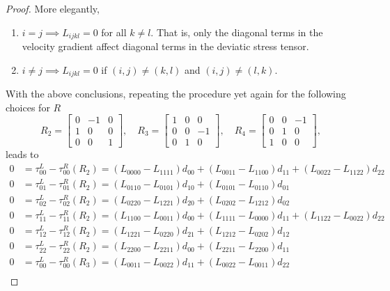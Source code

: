 \begin{proof}
    More elegantly,
    \begin{enumerate}
        \item $i=j \implies L_{ijkl}=0$ for all $k\neq l$.  That is, only the diagonal terms in the velocity gradient
            affect diagonal terms in the deviatic stress tensor.
        \item $i\neq j \implies L_{ijkl}=0$ if $(i,j)\neq (k,l)$ and $(i,j)\neq(l,k)$.
    \end{enumerate}
    With the above conclusions, repeating the procedure yet again for the following choices for $R$
    \begin{equation}
        R_2 = \begin{bmatrix}
            0 & -1 & 0 \\
            1 & 0 & 0 \\
            0 & 0 & 1
        \end{bmatrix}, \quad
        R_3 = \begin{bmatrix}
            1 & 0 & 0 \\
            0 & 0 & -1 \\
            0 & 1 & 0
        \end{bmatrix}, \quad
        R_4 = \begin{bmatrix}
            0 & 0 & -1 \\
            0 & 1 & 0  \\
            1 & 0 & 0
        \end{bmatrix},
    \end{equation}
    leads to
    \begin{align}
        0 &= \tau^L_{00} - \tau^R_{00}(R_2) = (L_{0000} - L_{1111})d_{00} + (L_{0011} - L_{1100})d_{11} + (L_{0022} - L_{1122})d_{22} \\
        0 &= \tau^L_{01} - \tau^R_{01}(R_2) = (L_{0110} - L_{0101})d_{10} + (L_{0101} - L_{0110})d_{01} \\
        0 &= \tau^L_{02} - \tau^R_{02}(R_2) = (L_{0220} - L_{1221})d_{20} + (L_{0202} - L_{1212})d_{02} \\
        0 &= \tau^L_{11} - \tau^R_{11}(R_2) = (L_{1100} - L_{0011})d_{00} + (L_{1111} - L_{0000})d_{11} + (L_{1122} - L_{0022})d_{22} \\
        0 &= \tau^L_{12} - \tau^R_{12}(R_2) = (L_{1221} - L_{0220})d_{21} + (L_{1212} - L_{0202})d_{12} \\
        0 &= \tau^L_{22} - \tau^R_{22}(R_2) = (L_{2200} - L_{2211})d_{00} + (L_{2211} - L_{2200})d_{11} \\
        0 &= \tau^L_{00} - \tau^R_{00}(R_3) = (L_{0011} - L_{0022})d_{11} + (L_{0022} - L_{0011})d_{22} \\

\end{align}
\end{proof}
